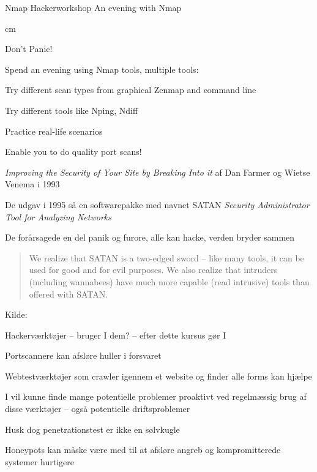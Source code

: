 \documentclass[20pt,landscape,a4paper,footrule]{foils}
\begin{document}
\rm
{}
\mytitlepage
{Nmap Hackerworkshop}
{An evening with Nmap}

\LogoOn



 cm

\centerline{\color{titlecolor}\LARGE Don't Panic!}

Spend an evening using Nmap tools, multiple tools:
\begin{list1}
\item Try different scan types from graphical Zenmap and command line
\item Try different tools like Nping, Ndiff
\item Practice real-life scenarios
\item Enable you to do quality port scans!

\end{list1}



\begin{list1}
\item \emph{Improving the Security of Your Site by Breaking Into it} af
Dan Farmer og Wietse Venema i 1993
\item De udgav i 1995 så en softwarepakke med navnet SATAN
\emph{Security Administrator Tool for Analyzing Networks}
\item De forårsagede en del panik og furore, alle kan hacke, verden bryder sammen

\vskip 1cm
\begin{quote}
We realize that SATAN is a two-edged sword -- like
many tools, it can be used for good and for evil
purposes. We also realize that intruders (including
wannabees) have much more capable (read intrusive)
tools than offered with SATAN.
\end{quote}
\end{list1}

\vskip 1cm
Kilde:



\begin{list1}
\item Hackerværktøjer -- bruger I dem? -- efter dette kursus gør I
\item Portscannere kan afsløre huller i forsvaret
\item Webtestværktøjer som crawler igennem et website og finder alle
  forms kan hjælpe
\item I vil kunne finde mange potentielle problemer proaktivt ved
  regelmæssig brug af disse værktøjer -- også potentielle driftsproblemer
\item Husk dog penetrationstest er ikke en sølvkugle
\item Honeypots kan måske være med til at afsløre angreb og
  kompromitterede systemer hurtigere
\end{list1}
\end{document}
